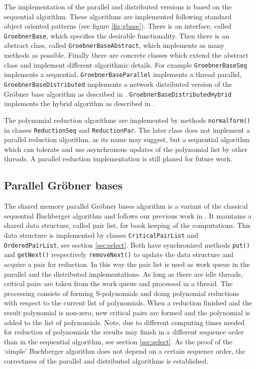 \documentclass[10pt,twocolumn,a4paper]{article}
\newcommand{\code}[1]{\texttt{#1}}
\begin{document}
The implementation of the parallel and distributed versions is based
on the sequential algorithm.  These algorithms are implemented
following standard object oriented patterns (see figure
\ref{fig:gbase}). There is an interface, called \code{Groebner\-Base},
which specifies the desirable functionality.  Then there is an
abstract class, called \code{Groebner\-Base\-Abs\-tract}, which
implements as many methods as possible.  Finally there are concrete
classes which extend the abstract class and implement different
algorithmic details.  For example \code{Groeb\-ner\-Base\-Seq}
implements a sequential, \code{Groeb\-ner\-Base\-Parallel} implements
a thread parallel, \code{Groeb\-ner\-Base\-Distri\-buted} implements a
network distributed version of the Gr\"obner base algorithm as
described in \cite{Kredel:2009}.
\code{Groeb\-ner\-Base\-Distri\-buted\-Hybrid} implements the hybrid
algorithm as described in \cite{Kredel:2010}.

The polynomial reduction algorithms are implemented by me\-thods
\code{nor\-mal\-form()} in classes \code{Re\-duc\-tion\-Seq} and
\code{Re\-duc\-tion\-Par}. The later class does not implement a parallel
reduction algorithm, as its name may suggest, but a sequential
algorithm which can tolerate and use asynchronous updates of the
polynomial list by other threads.  A parallel reduction implementation
is still planed for future work.


\subsection{Parallel Gr\"obner bases} 

The shared memory parallel Gr\"obner bases algorithm is a variant of
the classical sequential Buchberger algorithm and follows our previous
work in \cite{Kredel:1994}.  It maintains a shared data structure,
called pair list, for book keeping of the computations.  This data
structure is implemented by classes \code{Critical\-Pair\-List} and
\code{Ordered\-Pair\-List}, see section \ref{sec:select}.  Both have
synchronized methods \code{put()} and \code{get\-Next()} respectively
\code{remove\-Next()} to update the data structure and acquire a pair
for reduction. In this way the pair list is used as work queue in the
parallel and the distributed implementations.  As long as there are
idle threads, critical pairs are taken from the work queue and
processed in a thread. The processing consists of forming
S-polynomials and doing polynomial reductions with respect to the
current list of polynomials. When a reduction finished and the result
polynomial is non-zero, new critical pairs are formed and the
polynomial is added to the list of polynomials. Note, due to different
computing times needed for reduction of polynomials the results may
finish in a different sequence order than in the sequential algorithm,
see section \ref{sec:select}. As the proof of the `simple' Buchberger
algorithm does not depend on a certain sequence order, the correctness
of the parallel and distributed algorithms is established.
\end{document}
